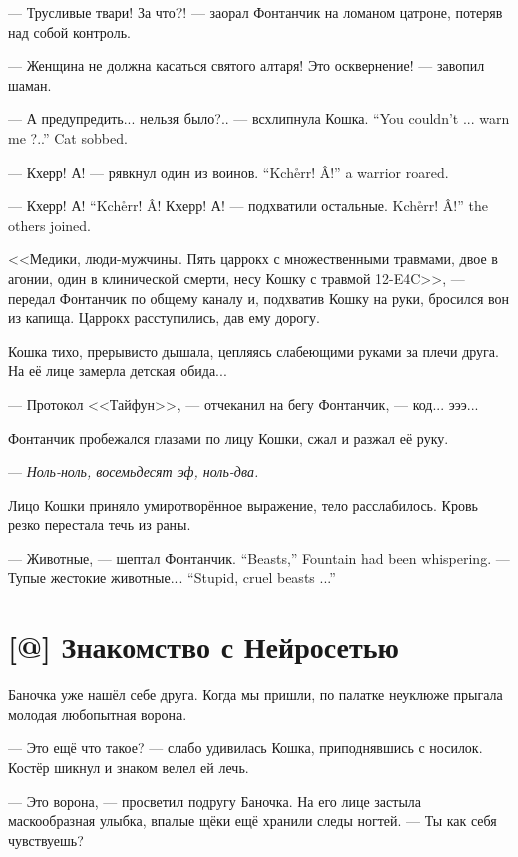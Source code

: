 --- Трусливые твари! За что?! --- заорал Фонтанчик на ломаном цатроне, потеряв над собой контроль.

--- Женщина не должна касаться святого алтаря!
Это осквернение! --- завопил шаман.

{--- А предупредить... нельзя было?.. --- всхлипнула Кошка.}
{``You couldn't ... warn me ?..'' Cat sobbed.}

{--- Кхерр! А! --- рявкнул один из воинов.}
{``Kch\r{e}rr! \^{A}!'' a warrior roared.}

{--- Кхерр! А!}
{``Kch\r{e}rr! \^{A}!}
{Кхерр! А! --- подхватили остальные.}
{Kch\r{e}rr! \^{A}!'' the others joined.}

<<Медики, люди-мужчины.
Пять царрокх с множественными травмами, двое в агонии, один в клинической смерти, несу Кошку с травмой 12-E4C>>, --- передал Фонтанчик по общему каналу и, подхватив Кошку на руки, бросился вон из капища.
Царрокх расступились, дав ему дорогу.

Кошка тихо, прерывисто дышала, цепляясь слабеющими руками за плечи друга.
На её лице замерла детская обида...

--- Протокол <<Тайфун>>, --- отчеканил на бегу Фонтанчик, --- код... эээ...

Фонтанчик пробежался глазами по лицу Кошки, сжал и разжал её руку.

--- \emph{Ноль-ноль, восемьдесят эф, ноль-два.}

Лицо Кошки приняло умиротворённое выражение, тело расслабилось.
Кровь резко перестала течь из раны.

{--- Животные, --- шептал Фонтанчик.}
{``Beasts,'' Fountain had been whispering.}
{--- Тупые жестокие животные...}
{``Stupid, cruel beasts ...''}


\section{[@] Знакомство с Нейросетью}

\textspace

Баночка уже нашёл себе друга.
Когда мы пришли, по палатке неуклюже прыгала молодая любопытная ворона.

--- Это ещё что такое? --- слабо удивилась Кошка, приподнявшись с носилок.
Костёр шикнул и знаком велел ей лечь.

--- Это ворона, --- просветил подругу Баночка.
На его лице застыла маскообразная улыбка, впалые щёки ещё хранили следы ногтей.
--- Ты как себя чувствуешь?

